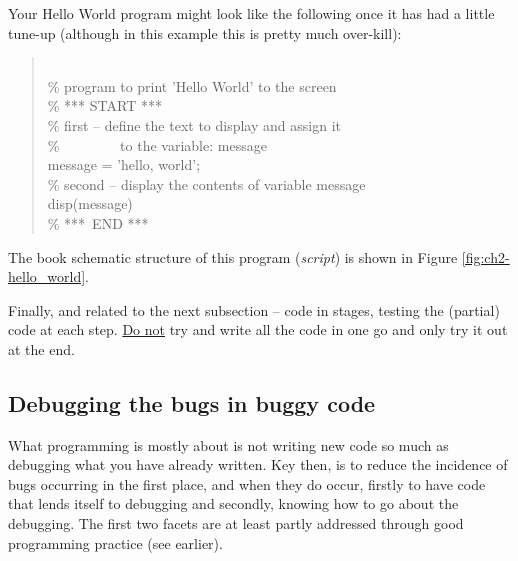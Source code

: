 \documentclass{tufte-book} %
\newenvironment{docspec}{\begin{quotation}\ttfamily\parskip0pt\parindent0pt\ignorespaces}{\end{quotation}}
\begin{document}
Your \textsf{Hello World} program might look like the following once it has had a little tune-up (although in this example this is pretty much over-kill):
\vspace{-4mm}
\begin{docspec}
\textcolor[rgb]{0,0.501961,0}{\\\% program to print 'Hello World' to the screen
\\\% *** START ***
\\\% first -- define the text to display and assign it 
\\\% \ \ \ \ \ \ \ \ to the variable: message}
\\message = 'hello, world';
\textcolor[rgb]{0,0.501961,0}{\\\% second -- display the contents of variable message}
\\disp(message)
\textcolor[rgb]{0,0.501961,0}{\\\% ***\ END ***}
\end{docspec}

The book schematic structure of this program (\textit{script}) is shown in Figure \ref{fig:ch2-hello_world}.

Finally, and related to the next subsection -- code in stages, testing the (partial) code at each step. \uline{Do not} try and write all the code in one go and only try it out at the end.

\newpage 

\subsection{Debugging the bugs in buggy code}

What programming is mostly about is not writing new code so much as debugging what you have already written. Key then, is to reduce the incidence of bugs occurring in the first place, and when they do occur, firstly to have code that lends itself to debugging and secondly, knowing how to go about the debugging. The first two facets are at least partly addressed through good programming practice (see earlier).
\end{document}
